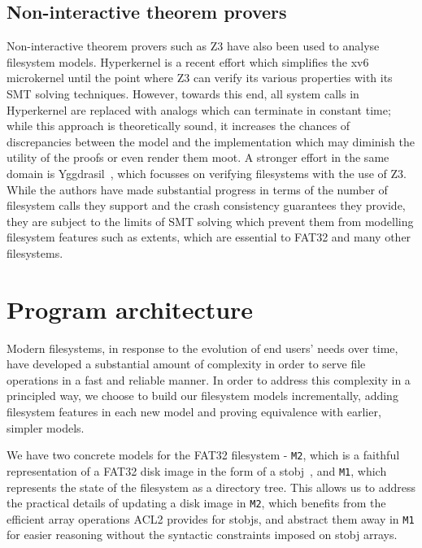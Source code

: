 \documentclass[submission,copyright,creativecommons]{eptcs}
\begin{document}
\subsection{Non-interactive theorem provers}
Non-interactive theorem provers such as Z3 \cite{de2008z3}
have also been used to analyse filesystem models. Hyperkernel
\cite{Nelson:2017:HPV:3132747.3132748} is a recent effort which
simplifies the xv6~\cite{cox6xv6} microkernel until the point where Z3
can verify its various properties with its SMT solving
techniques. However, towards this end, all system calls in Hyperkernel
are replaced with analogs which can terminate in constant time; while
this approach is theoretically sound, it increases the chances of
discrepancies between the model and
the implementation which may diminish the utility of the proofs or
even render them moot. A stronger effort in the same domain is
Yggdrasil~\cite{sigurbjarnarson2016push}, which focusses on verifying
filesystems with the use of Z3. While the authors have made substantial
progress in terms of the number of filesystem calls they support and
the crash consistency guarantees they provide, they are subject to
the limits of SMT solving which prevent them from modelling filesystem
features such as extents, which are essential to FAT32 and many other
filesystems.

\section{Program architecture}

Modern filesystems, in response to the evolution of end users' needs
over time, have developed a substantial amount of complexity in order
to serve file operations in a fast and reliable manner. In order to
address this complexity in a principled way, we choose to build our
filesystem models incrementally, adding filesystem features in each
new model and proving equivalence with earlier, simpler models.

We have two concrete models for the FAT32 filesystem - \texttt{M2},
which is a faithful representation of a FAT32 disk image in the form
of a stobj~\cite{boyer2002single}, and \texttt{M1}, which represents the
state of the filesystem as a directory tree. This allows us to
address the practical details of updating a disk image in \texttt{M2},
which benefits from the efficient array operations ACL2 provides
for stobjs, and abstract them away in \texttt{M1} for easier reasoning
without the syntactic constraints imposed on stobj arrays.
\end{document}
